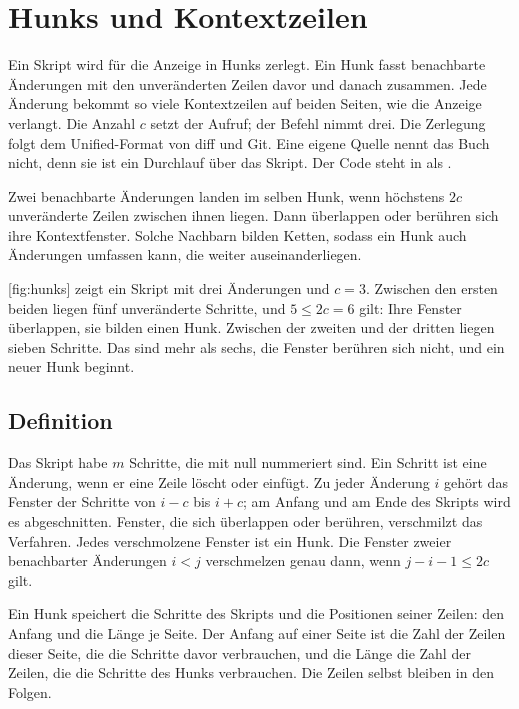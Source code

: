 \section[sec:hunks]{Hunks und Kontextzeilen}

Ein Skript wird für die Anzeige in Hunks zerlegt. Ein Hunk fasst benachbarte Änderungen mit den
unveränderten Zeilen davor und danach zusammen. Jede Änderung bekommt so viele Kontextzeilen auf
beiden Seiten, wie die Anzeige verlangt. Die Anzahl $c$ setzt der Aufruf; der Befehl 
nimmt drei. Die Zerlegung folgt dem Unified-Format von diff und Git. Eine eigene Quelle nennt das
Buch nicht, denn sie ist ein Durchlauf über das Skript. Der Code steht in  als
.

Zwei benachbarte Änderungen landen im selben Hunk, wenn höchstens $2c$ unveränderte Zeilen
zwischen ihnen liegen. Dann überlappen oder berühren sich ihre Kontextfenster. Solche Nachbarn
bilden Ketten, sodass ein Hunk auch Änderungen umfassen kann, die weiter auseinanderliegen.

[fig:hunks] zeigt ein Skript mit drei Änderungen und $c = 3$. Zwischen den ersten
beiden liegen fünf unveränderte Schritte, und $5 \le 2c = 6$ gilt: Ihre Fenster überlappen, sie
bilden einen Hunk. Zwischen der zweiten und der dritten liegen sieben Schritte. Das sind mehr als
sechs, die Fenster berühren sich nicht, und ein neuer Hunk beginnt.

\startplacefigure[title={Gruppierung eines Skripts in Hunks mit $c = 3$},
    reference=fig:hunks,location=here]
\stopplacefigure

\subsection{Definition}

Das Skript habe $m$ Schritte, die mit null nummeriert sind. Ein Schritt ist eine Änderung, wenn er
eine Zeile löscht oder einfügt. Zu jeder Änderung $i$ gehört das Fenster der Schritte von $i-c$
bis $i+c$; am Anfang und am Ende des Skripts wird es abgeschnitten. Fenster, die sich überlappen
oder berühren, verschmilzt das Verfahren. Jedes verschmolzene Fenster ist ein Hunk. Die Fenster
zweier benachbarter Änderungen $i < j$ verschmelzen genau dann, wenn $j - i - 1 \le 2c$ gilt.

Ein Hunk speichert die Schritte des Skripts und die Positionen seiner Zeilen: den Anfang und die
Länge je Seite. Der Anfang auf einer Seite ist die Zahl der Zeilen dieser Seite, die die Schritte
davor verbrauchen, und die Länge die Zahl der Zeilen, die die Schritte des Hunks verbrauchen. Die
Zeilen selbst bleiben in den Folgen.

